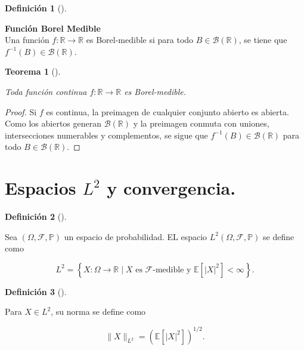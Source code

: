 \documentclass[
  spanish,
  us-letterpaper,
]{scrreprt}
\theoremstyle{plain}
\theoremstyle{plain}
\theoremstyle{definition}
\newtheorem{definition}{Definición}[chapter]
\theoremstyle{plain}
\newtheorem{theorem}{Teorema}[chapter]
\theoremstyle{remark}
\begin{document}
\begin{definition}[]\protect\hypertarget{def-fun_borel}{}\label{def-fun_borel}

\textbf{Función Borel Medible}\\
Una función \(f: \mathbb{R} \to \mathbb{R}\) es Borel-medible si para
todo \(B \in \mathcal{B}(\mathbb{R})\), se tiene que
\(f^{-1}(B) \in \mathcal{B}(\mathbb{R})\).

\end{definition}

\begin{theorem}[]\protect\hypertarget{thm-}{}\label{thm-}

Toda función continua \(f: \mathbb{R}\to \mathbb{R}\) es Borel-medible.

\end{theorem}

\begin{proof}
Si \(f\) es continua, la preimagen de cualquier conjunto abierto es
abierta. Como los abiertos generan \(\mathcal{B}(\mathbb{R})\) y la
preimagen conmuta con uniones, intersecciones numerables y complementos,
se sigue que \(f^{-1}(B) \in \mathcal{B}(\mathbb{R})\) para todo
\(B \in \mathcal{B}(\mathbb{R})\).
\end{proof}

\section{\texorpdfstring{Espacios \(L^2\) y
convergencia.}{Espacios L\^{}2 y convergencia.}}\label{espacios-l2-y-convergencia.}

\begin{definition}[]\protect\hypertarget{def-espacio_l2}{}\label{def-espacio_l2}

Sea \((\Omega,\mathcal{F},\mathbb{P})\) un espacio de probabilidad. EL
espacio \(L^2(\Omega, \mathcal{F}, \mathbb{P})\) se define como

\[
L^2 = \left\{ X: \Omega \to \mathbb{R} \mid X \text{ es } \mathcal{F}\text{-medible y } \mathbb{E}[|X|^2] < \infty \right\}.
\]

\end{definition}

\begin{definition}[]\protect\hypertarget{def-norma_l2}{}\label{def-norma_l2}

Para \(X \in L^2\), su norma se define como

\[
\|X\|_{L^2} = \left( \mathbb{E}[|X|^2] \right)^{1/2}.
\]

\end{definition}
\end{document}
